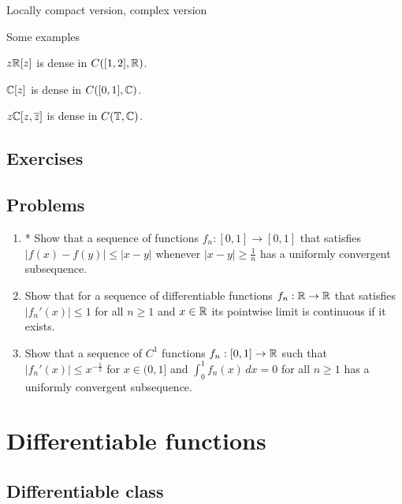 \documentclass{../../large}
\begin{document}
Locally compact version,
complex version








\begin{prb}
Some examples
\begin{parts}
\item $z\mathbb{R}[z]$ is dense in $C([1,2],\mathbb{R})$.
\item $\mathbb{C}[z]$ is dense in $C([0,1],\mathbb{C})$.
\item $z\mathbb{C}[z,\overline z]$ is dense in $C(\mathbb{T},\mathbb{C})$.
\end{parts}
\end{prb}







\section*{Exercises}
\begin{prb}
\end{prb}
\section*{Problems}
\begin{enumerate}
\item* Show that a sequence of functions $f_n:[0,1]\to[0,1]$ that satisfies $|f(x)-f(y)|\le|x-y|$ whenever $|x-y|\ge\frac1n$ has a uniformly convergent subsequence.
\item Show that for a sequence of differentiable functions $f_n:\mathbb{R}\to\mathbb{R}$ that satisfies $|f_n'(x)|\le1$ for all $n\ge1$ and $x\in\mathbb{R}$ its pointwise limit is continuous if it exists.
\item Show that a sequence of $C^1$ functions $f_n:[0,1]\to\mathbb{R}$ such that $|f_n'(x)|\le x^{-\frac12}$ for $x\in(0,1]$ and $\int_0^1f_n(x)\,dx=0$ for all $n\ge1$ has a uniformly convergent subsequence.
\end{enumerate}

\chapter{Differentiable functions}
\section{Differentiable class}
\end{document}
